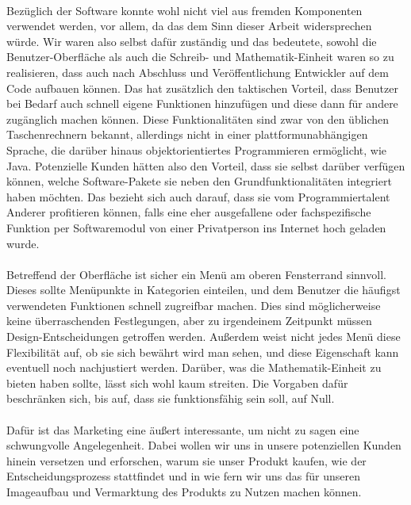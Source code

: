 \ \\
Bezüglich der Software konnte wohl nicht viel aus fremden Komponenten verwendet werden, vor allem, da das dem Sinn dieser Arbeit widersprechen würde. Wir waren also selbst dafür zuständig und das bedeutete, sowohl die Benutzer-Oberfläche als auch die Schreib- und Mathematik-Einheit waren so zu realisieren, dass auch nach Abschluss und Veröffentlichung Entwickler auf dem Code aufbauen können. Das hat zusätzlich den taktischen Vorteil, dass Benutzer bei Bedarf auch schnell eigene Funktionen hinzufügen und diese dann für andere zugänglich machen können. Diese Funktionalitäten sind zwar von den üblichen Taschenrechnern bekannt, allerdings nicht in einer plattformunabhängigen Sprache, die darüber hinaus objektorientiertes Programmieren ermöglicht, wie Java.
Potenzielle Kunden hätten also den Vorteil, dass sie selbst darüber verfügen können, welche Software-Pakete sie neben den Grundfunktionalitäten integriert haben möchten. Das bezieht sich auch darauf, dass sie vom Programmiertalent Anderer profitieren können, falls eine eher ausgefallene oder fachspezifische Funktion per Softwaremodul von einer Privatperson ins Internet hoch geladen wurde.\\\\
Betreffend der Oberfläche ist sicher ein Menü am oberen Fensterrand sinnvoll. Dieses sollte Menüpunkte in Kategorien einteilen, und dem Benutzer die häufigst verwendeten Funktionen schnell zugreifbar machen. Dies sind möglicherweise keine überraschenden Festlegungen, aber zu irgendeinem Zeitpunkt müssen Design-Entscheidungen getroffen werden. Außerdem weist nicht jedes Menü diese Flexibilität auf, ob sie sich bewährt wird man sehen, und diese Eigenschaft kann eventuell noch nachjustiert werden.
Darüber, was die Mathematik-Einheit zu bieten haben sollte, lässt sich wohl kaum streiten. Die Vorgaben dafür beschränken sich, bis auf, dass sie funktionsfähig sein soll, auf Null.\\\\
Dafür ist das Marketing eine äußert interessante, um nicht zu sagen eine schwungvolle Angelegenheit. Dabei wollen wir uns in unsere potenziellen Kunden hinein versetzen und erforschen, warum sie unser Produkt kaufen, wie der Entscheidungsprozess stattfindet und in wie fern wir uns das für unseren Imageaufbau und Vermarktung des Produkts zu Nutzen machen können.